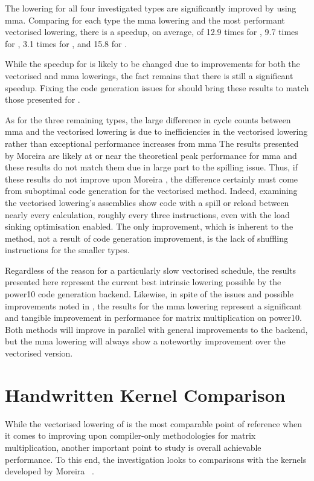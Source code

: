 \documentclass[\main/thesis.tex]{subfiles}
\begin{document}
The lowering for all four investigated types are significantly improved by using \gls{mma}.
Comparing for each type the \gls{mma} lowering and the most performant vectorised lowering, there is a speedup, on average, of 12.9 times for , 9.7 times for , 3.1 times for , and 15.8 for .

While the speedup for  is likely to be changed due to improvements for both the vectorised and \gls{mma} lowerings, the fact remains that there is still a significant speedup.
Fixing the code generation issues for  should bring these results to match those presented for .

As for the three remaining types, the large difference in cycle counts between \gls{mma} and the vectorised lowering is due to inefficiencies in the vectorised lowering rather than exceptional performance increases from \gls{mma}
The results presented by Moreira \etal are likely at or near the theoretical peak performance for \gls{mma} and these results do not match them due in large part to the spilling issue.
Thus, if these results do not improve upon Moreira \etal, the difference certainly must come from suboptimal code generation for the vectorised method.
Indeed, examining the vectorised lowering's assemblies show code with a spill or reload between nearly every calculation, roughly every three instructions, even with the load sinking optimisation enabled.
The only improvement, which is inherent to the method, not a result of code generation improvement, is the lack of shuffling instructions for the smaller types.

Regardless of the reason for a particularly slow vectorised schedule, the results presented here represent the current best intrinsic lowering possible by the \gls{power10} code generation backend.
Likewise, in spite of the issues and possible improvements noted in , the results for the \gls{mma} lowering represent a significant and tangible improvement in performance for matrix multiplication on \gls{power10}.
Both methods will improve in parallel with general improvements to the backend, but the \gls{mma} lowering will always show a noteworthy improvement over the vectorised version.

\section{Handwritten Kernel Comparison}
While the vectorised lowering of  is the most comparable point of reference when it comes to improving upon compiler-only methodologies for matrix multiplication, another important point to study is overall achievable performance.
To this end, the investigation looks to comparisons with the kernels developed by Moreira \etal~\autocite{moreira2021matrix}.
\end{document}
